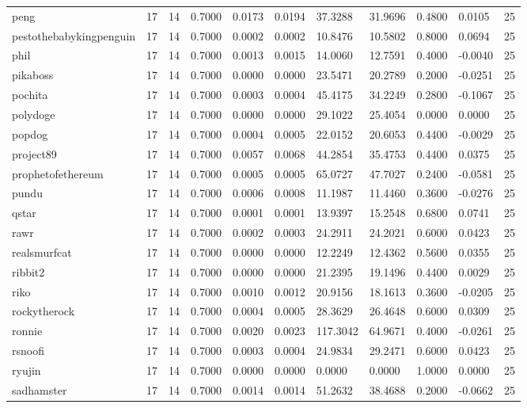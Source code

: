 \begin{table}[htbp]
\begin{tabular}{lllllllllll}
peng & 17 & 14 & 0.7000 & 0.0173 & 0.0194 & 37.3288 & 31.9696 & 0.4800 & 0.0105 & 25 \\
pestothebabykingpenguin & 17 & 14 & 0.7000 & 0.0002 & 0.0002 & 10.8476 & 10.5802 & 0.8000 & 0.0694 & 25 \\
phil & 17 & 14 & 0.7000 & 0.0013 & 0.0015 & 14.0060 & 12.7591 & 0.4000 & -0.0040 & 25 \\
pikaboss & 17 & 14 & 0.7000 & 0.0000 & 0.0000 & 23.5471 & 20.2789 & 0.2000 & -0.0251 & 25 \\
pochita & 17 & 14 & 0.7000 & 0.0003 & 0.0004 & 45.4175 & 34.2249 & 0.2800 & -0.1067 & 25 \\
polydoge & 17 & 14 & 0.7000 & 0.0000 & 0.0000 & 29.1022 & 25.4054 & 0.0000 & 0.0000 & 25 \\
popdog & 17 & 14 & 0.7000 & 0.0004 & 0.0005 & 22.0152 & 20.6053 & 0.4400 & -0.0029 & 25 \\
project89 & 17 & 14 & 0.7000 & 0.0057 & 0.0068 & 44.2854 & 35.4753 & 0.4400 & 0.0375 & 25 \\
prophetofethereum & 17 & 14 & 0.7000 & 0.0005 & 0.0005 & 65.0727 & 47.7027 & 0.2400 & -0.0581 & 25 \\
pundu & 17 & 14 & 0.7000 & 0.0006 & 0.0008 & 11.1987 & 11.4460 & 0.3600 & -0.0276 & 25 \\
qstar & 17 & 14 & 0.7000 & 0.0001 & 0.0001 & 13.9397 & 15.2548 & 0.6800 & 0.0741 & 25 \\
rawr & 17 & 14 & 0.7000 & 0.0002 & 0.0003 & 24.2911 & 24.2021 & 0.6000 & 0.0423 & 25 \\
realsmurfcat & 17 & 14 & 0.7000 & 0.0000 & 0.0000 & 12.2249 & 12.4362 & 0.5600 & 0.0355 & 25 \\
ribbit2 & 17 & 14 & 0.7000 & 0.0000 & 0.0000 & 21.2395 & 19.1496 & 0.4400 & 0.0029 & 25 \\
riko & 17 & 14 & 0.7000 & 0.0010 & 0.0012 & 20.9156 & 18.1613 & 0.3600 & -0.0205 & 25 \\
rockytherock & 17 & 14 & 0.7000 & 0.0004 & 0.0005 & 28.3629 & 26.4648 & 0.6000 & 0.0309 & 25 \\
ronnie & 17 & 14 & 0.7000 & 0.0020 & 0.0023 & 117.3042 & 64.9671 & 0.4000 & -0.0261 & 25 \\
rsnoofi & 17 & 14 & 0.7000 & 0.0003 & 0.0004 & 24.9834 & 29.2471 & 0.6000 & 0.0423 & 25 \\
ryujin & 17 & 14 & 0.7000 & 0.0000 & 0.0000 & 0.0000 & 0.0000 & 1.0000 & 0.0000 & 25 \\
sadhamster & 17 & 14 & 0.7000 & 0.0014 & 0.0014 & 51.2632 & 38.4688 & 0.2000 & -0.0662 & 25 \\

\end{tabular}
\end{table}
